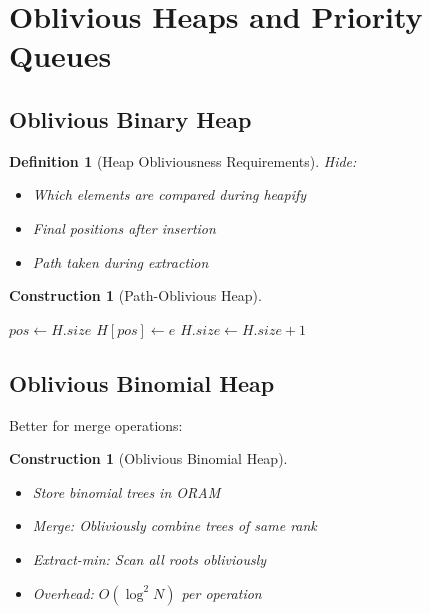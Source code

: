 \documentclass[11pt,final]{article}
\newtheorem{definition}[theorem]{Definition}
\newtheorem{construction}[theorem]{Construction}
\begin{document}
\section{Oblivious Heaps and Priority Queues}

\subsection{Oblivious Binary Heap}

\begin{definition}[Heap Obliviousness Requirements]
Hide:
\begin{itemize}
    \item Which elements are compared during heapify
    \item Final positions after insertion
    \item Path taken during extraction
\end{itemize}
\end{definition}

\begin{construction}[Path-Oblivious Heap]
\begin{algorithm}[H]
\caption{Oblivious Heap Insert}
$pos \gets H.size$\;
$H[pos] \gets e$\;
$H.size \gets H.size + 1$\;
\end{algorithm}
\end{construction}

\subsection{Oblivious Binomial Heap}

Better for merge operations:

\begin{construction}[Oblivious Binomial Heap]
\begin{itemize}
    \item Store binomial trees in ORAM
    \item Merge: Obliviously combine trees of same rank
    \item Extract-min: Scan all roots obliviously
    \item Overhead: $O(\log^2 N)$ per operation
\end{itemize}
\end{construction}
\end{document}
